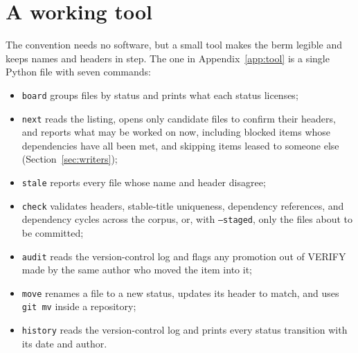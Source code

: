 \documentclass[11pt]{article}
\newcommand{\st}[1]{\textsf{#1}}
\begin{document}
\section{A working tool}\label{sec:tool}

The convention needs no software, but a small tool makes the berm legible and keeps names and headers in step. The one in Appendix~\ref{app:tool} is a single Python file with seven commands:
\begin{itemize}[leftmargin=2em,itemsep=2pt]
\item \texttt{board} groups files by status and prints what each status licenses;
\item \texttt{next} reads the listing, opens only candidate files to confirm their headers, and reports what may be worked on now, including blocked items whose dependencies have all been met, and skipping items leased to someone else (Section~\ref{sec:writers});
\item \texttt{stale} reports every file whose name and header disagree;
\item \texttt{check} validates headers, stable-title uniqueness, dependency references, and dependency cycles across the corpus, or, with \texttt{--staged}, only the files about to be committed;
\item \texttt{audit} reads the version-control log and flags any promotion out of \st{VERIFY} made by the same author who moved the item into it;
\item \texttt{move} renames a file to a new status, updates its header to match, and uses \texttt{git mv} inside a repository;
\item \texttt{history} reads the version-control log and prints every status transition with its date and author.
\end{itemize}
\end{document}
